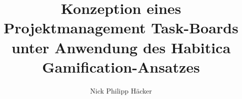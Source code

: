\documentclass[sigconf, nonacm]{acmart}
\begin{document}
\title{Konzeption eines Projektmanagement Task-Boards unter Anwendung des Habitica Gamification-Ansatzes}

\author{Nick Philipp Häcker}




\begin{abstract}


\end{abstract}

\maketitle
\end{document}
